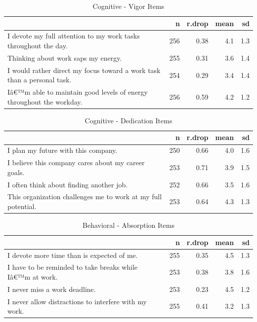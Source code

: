 \documentclass[
]{book}
\begin{document}
\begin{table}

\caption{\label{tab:rdrop11}Cognitive - Vigor Items}
\centering
\begin{tabular}[t]{l|r|r|r|r}
\hline
  & n & r.drop & mean & sd\\
\hline
I devote my full attention to my work tasks throughout the day. & 256 & 0.38 & 4.1 & 1.3\\
\hline
Thinking about work saps my energy. & 255 & 0.31 & 3.6 & 1.4\\
\hline
I would rather direct my focus toward a work task than a personal task. & 254 & 0.29 & 3.4 & 1.4\\
\hline
Iâ€™m able to maintain good levels of energy throughout the workday. & 256 & 0.59 & 4.2 & 1.2\\
\hline
\end{tabular}
\end{table}

\begin{table}

\caption{\label{tab:rdrop12}Cognitive - Dedication Items}
\centering
\begin{tabular}[t]{l|r|r|r|r}
\hline
  & n & r.drop & mean & sd\\
\hline
I plan my future with this company. & 250 & 0.66 & 4.0 & 1.6\\
\hline
I believe this company cares about my career goals. & 253 & 0.71 & 3.9 & 1.5\\
\hline
I often think about finding another job. & 252 & 0.66 & 3.5 & 1.6\\
\hline
This organization challenges me to work at my full potential. & 253 & 0.64 & 4.3 & 1.3\\
\hline
\end{tabular}
\end{table}

\begin{table}

\caption{\label{tab:rdrop13}Behavioral - Absorption Items}
\centering
\begin{tabular}[t]{l|r|r|r|r}
\hline
  & n & r.drop & mean & sd\\
\hline
I devote more time than is expected of me. & 255 & 0.35 & 4.5 & 1.3\\
\hline
I have to be reminded to take breaks while Iâ€™m at work. & 253 & 0.38 & 3.8 & 1.6\\
\hline
I never miss a work deadline. & 253 & 0.23 & 4.5 & 1.2\\
\hline
I never allow distractions to interfere with my work. & 255 & 0.41 & 3.2 & 1.3\\
\hline
\end{tabular}
\end{table}
\end{document}
